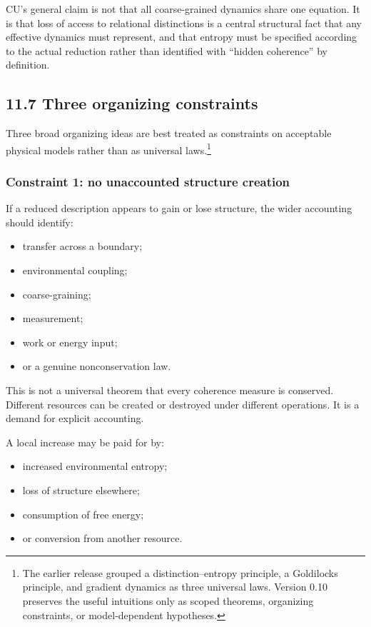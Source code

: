 \documentclass[
  11pt,
]{article}
\providecommand{\tightlist}{%
  \setlength{\itemsep}{0pt}\setlength{\parskip}{0pt}}
\begin{document}
CU's general claim is not that all coarse-grained dynamics share one
equation. It is that loss of access to relational distinctions is a
central structural fact that any effective dynamics must represent, and
that entropy must be specified according to the actual reduction rather
than identified with ``hidden coherence'' by definition.

\subsection{11.7 Three organizing
constraints}\label{three-organizing-constraints}

Three broad organizing ideas are best treated as constraints on
acceptable physical models rather than as universal laws.\footnote{The
  earlier release grouped a distinction--entropy principle, a Goldilocks
  principle, and gradient dynamics as three universal laws. Version 0.10
  preserves the useful intuitions only as scoped theorems, organizing
  constraints, or model-dependent hypotheses.}

\subsubsection{Constraint 1: no unaccounted structure
creation}\label{constraint-1-no-unaccounted-structure-creation}

If a reduced description appears to gain or lose structure, the wider
accounting should identify:

\begin{itemize}
\tightlist
\item
  transfer across a boundary;
\item
  environmental coupling;
\item
  coarse-graining;
\item
  measurement;
\item
  work or energy input;
\item
  or a genuine nonconservation law.
\end{itemize}

This is not a universal theorem that every coherence measure is
conserved. Different resources can be created or destroyed under
different operations. It is a demand for explicit accounting.

A local increase may be paid for by:

\begin{itemize}
\tightlist
\item
  increased environmental entropy;
\item
  loss of structure elsewhere;
\item
  consumption of free energy;
\item
  or conversion from another resource.
\end{itemize}
\end{document}
